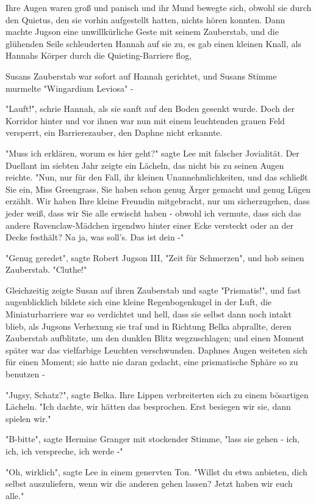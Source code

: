 {Ihre Augen waren groß und panisch und ihr Mund bewegte sich, obwohl sie durch den Quietus, den sie vorhin aufgestellt hatten, nichts hören konnten. Dann machte Jugson eine unwillkürliche Geste mit seinem Zauberstab, und die glühenden Seile schleuderten Hannah auf sie zu, es gab einen kleinen Knall, als Hannahs Körper durch die Quieting-Barriere flog,

Susans Zauberstab war sofort auf Hannah gerichtet, und Susans Stimme murmelte "Wingardium Leviosa" -

"Lauft!", schrie Hannah, als sie sanft auf den Boden gesenkt wurde. Doch der Korridor hinter und vor ihnen war nun mit einem leuchtenden grauen Feld versperrt, ein Barrierezauber, den Daphne nicht erkannte.

"Muss ich erklären, worum es hier geht?" sagte Lee mit falscher Jovialität. Der Duellant im siebten Jahr zeigte ein Lächeln, das nicht bis zu seinen Augen reichte. "Nun, nur für den Fall, ihr kleinen Unannehmlichkeiten, und das schließt Sie ein, Miss Greengrass, Sie haben schon genug Ärger gemacht und genug Lügen erzählt. Wir haben Ihre kleine Freundin mitgebracht, nur um sicherzugehen, dass jeder weiß, dass wir Sie alle erwischt haben - obwohl ich vermute, dass sich das andere Ravenclaw-Mädchen irgendwo hinter einer Ecke versteckt oder an der Decke festhält? Na ja, was soll's. Das ist dein -"

"Genug geredet", sagte Robert Jugson III, "Zeit für Schmerzen", und hob seinen Zauberstab. "Cluthe!"

Gleichzeitig zeigte Susan auf ihren Zauberstab und sagte "Prismatis!", und fast augenblicklich bildete sich eine kleine Regenbogenkugel in der Luft, die Miniaturbarriere war so verdichtet und hell, dass sie selbst dann noch intakt blieb, als Jugsons Verhexung sie traf und in Richtung Belka abprallte, deren Zauberstab aufblitzte, um den dunklen Blitz wegzuschlagen; und einen Moment später war das vielfarbige Leuchten verschwunden. Daphnes Augen weiteten sich für einen Moment; sie hatte nie daran gedacht, eine prismatische Sphäre so zu benutzen -

"Jugsy, Schatz?", sagte Belka. Ihre Lippen verbreiterten sich zu einem bösartigen Lächeln. "Ich dachte, wir hätten das besprochen. Erst besiegen wir sie, dann spielen wir."

"B-bitte", sagte Hermine Granger mit stockender Stimme, "lass sie gehen - ich, ich, ich verspreche, ich werde -"

"Oh, wirklich", sagte Lee in einem genervten Ton. "Willst du etwa anbieten, dich selbst auszuliefern, wenn wir die anderen gehen lassen? Jetzt haben wir euch alle."

}

